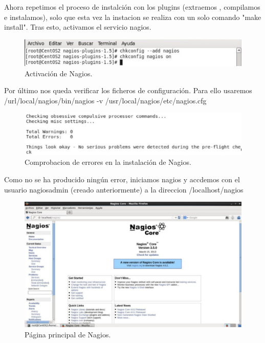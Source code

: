 Ahora repetimos el proceso de instalción con los plugins (extraemos , compilamos e instalamos), solo que esta vez la instacion se realiza con un solo comando "make install". Tras esto, activamos el servicio nagios.

\begin{figure}[H]
\begin{center}
\includegraphics[scale=0.4]{imagenes/opcional2-5.eps}
\caption{Activación de Nagios.}
\end{center}
\end{figure}

Por último nos queda verificar los ficheros de configuración. Para ello usaremos /url/local/nagios/bin/nagios -v /usr/local/nagios/etc/nagios.cfg

\begin{figure}[H]
\begin{center}
\includegraphics[scale=0.4]{imagenes/opcional2-6.eps}
\caption{Comprobacion de errores en la instalación de Nagios.}
\end{center}
\end{figure}

Como no se ha producido ningún error, iniciamos nagios y accdemos con el usuario nagiosadmin (creado anteriormente) a la direccion /localhost/nagios

\begin{figure}[H]
\begin{center}
\includegraphics[scale=0.4]{imagenes/opcional2-7.eps}
\caption{Página principal de Nagios.}
\end{center}
\end{figure}

